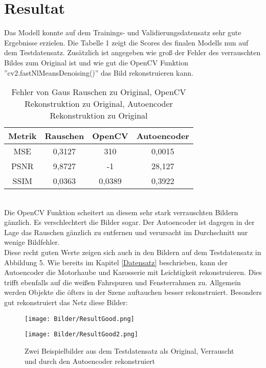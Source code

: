 \documentclass[conference]{IEEEtran}
\begin{document}
\section{Resultat}
Das Modell konnte auf dem Trainings- und Validierungsdatensatz sehr gute Ergebnisse erzielen. Die Tabelle 1 zeigt die Scores des finalen Modells nun auf dem Testdatensatz. Zusätzlich ist angegeben wie groß der Fehler des verrauschten Bildes zum Original ist und wie gut die OpenCV Funktion ''cv2.fastNlMeansDenoising()'' das Bild rekonstruieren kann.
\begin{table}[h!]
	\centering
	\begin{tabular}{|c|c|c|c|}
		\hline
		Metrik & Rauschen & OpenCV   & Autoencoder  \\
		\hline
		MSE &  0,3127 & 310 &  0,0015 \\
		\hline
		PSNR & 9,8727 & -1 & 28,127 \\
		\hline
		SSIM & 0,0363 & 0,0389 & 0,3922 \\
		\hline
	\end{tabular}
	\caption{Fehler von Gaus Rauschen zu Original, OpenCV Rekonstruktion zu Original, Autoencoder Rekonstruktion zu Original}
\end{table}\\
Die OpenCV Funktion scheitert an diesem sehr stark verrauschten Bildern gänzlich. Es verschlechtert die Bilder sogar. Der Autoencoder ist dagegen in der Lage das Rauschen gänzlich zu entfernen und verursacht im Durchschnitt nur wenige Bildfehler.\\
Diese recht guten Werte zeigen sich auch in den Bildern auf dem Testdatensatz in Abbildung 5. Wie bereits im Kapitel \ref{Datensatz} beschrieben, kann der Autoencoder die Motorhaube und Karosserie mit Leichtigkeit rekonstruieren. Dies trifft ebenfalls auf die weißen Fahrspuren und Fensterrahmen zu. Allgemein werden Objekte die öfters in der Szene auftauchen besser rekonstruiert. Besonders gut rekonstruiert das Netz diese Bilder:
\begin{figure}[h]
	\begin{minipage}[t]{.21\textwidth}
		\begin{center}  
			\texttt{[image: Bilder/ResultGood.png]}
		\end{center}
	\end{minipage}
	\hspace{0.5cm}
	\begin{minipage}[t]{.21\textwidth}
		\begin{center}  
			\texttt{[image: Bilder/ResultGood2.png]}
		\end{center}
	\end{minipage}
	\hspace{0.5cm}
	\caption{Zwei Beispielbilder aus dem Testdatensatz als Original, Verrauscht und durch den Autoencoder rekonstruiert}
\end{figure}\\
\end{document}
